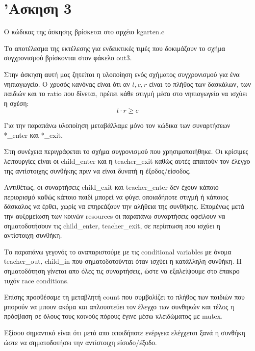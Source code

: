 \documentclass[12pt]{article}
\begin{document}
\section*{'Ασκηση 3}

Ο κώδικας της άσκησης βρίσκεται στο αρχέιο \textlatin{kgarten.c}

Το αποτέλεσμα της εκτέλεσης για ενδεικτικές τιμές που δοκιμάζουν το σχήμα συγχρονισμού βρίσκονται στον φάκελο \textlatin{out3}.


Στην άσκηση αυτή μας ζητείται η υλοποίηση ενός σχήματος συγχρονισμού για ένα νηπιαγωγείο. Ο χρυσός κανόνας είναι ότι αν $t,c,r$ είναι το πλήθος των δασκάλων, των παιδιών και το \textlatin{ratio} που δίνεται, πρέπει κάθε στιγμή μέσα στο νηπιαγωγείο να ισχύει η σχέση:
\[ t \cdot r \geq c \]

Για την παραπάνω υλοποίηση μεταβάλλαμε μόνο τον κώδικα των συναρτήσεων \textlatin{*\_enter} και \textlatin{*\_exit}.

Στη  συνέχεια περιγράφεται  το σχήμα συγρονισμού που χρησιμοποιήθηκε. Οι κρίσιμες λειτουργίες είναι οι \textlatin{child\_enter} και η \textlatin{teacher\_exit} καθώς αυτές απαιτούν τον έλεγχο της αντίστοιχης συνθήκης πριν να είναι δυνατή η έξοδος/είσοδος. 

Αντιθέτως, οι συναρτήσεις \textlatin{child\_exit} και \textlatin{teacher\_enter} δεν έχουν κάποιο περιορισμό καθώς κάποιο παιδί μπορεί να φύγει οποιαδήποτε στιγμή ή κάποιος δάσκαλος να έρθει, χωρίς να επηρεάζουν την αλήθεια της συνθήκης. Επομένως μετά την αυξομείωση των κοινών \textlatin{resources} οι παραπάνω συναρτήσεις οφείλουν να σηματοδοτήσουν τις \textlatin{child\_enter}, \textlatin{teacher\_exit}, σε περίπτωση που ισχύει η αντίστοιχη συνθήκη.

Το παραπάνω γεγονός το αναπαριστούμε με τις \textlatin{conditional variables} με όνομα \textlatin{teacher\_out, child\_in} που σηματοδοτούνται όταν ισχύει η κατάλληλη συνθήκη.
Η σηματοδότηση γίνεται απο όλες τις συναρτήσεις, ώστε να εξαλείψουμε στο έπακρο τυχόν \textlatin{race conditions}.

Επίσης προσθέσαμε τη μεταβλητή \textlatin{count} που συμβολίζει το πλήθος των παιδιών που μπορούν να μπουν ακόμα και  απλουστεύει τον έλεγχο των συνθηκών και τέλος η πρόσβαση σε όλους τους κοινούς πόρους έγινε μέσω κλειδώματος με \textlatin{mutex}.

Εξίσου σημαντικό είναι ότι μετά απο οποιδήποτε ενέργεια ελέγχεται ξανά η συνθήκη ώστε να σηματοδοτήσει την αντίστοιχη είσοδο/έξοδο.
\end{document}
